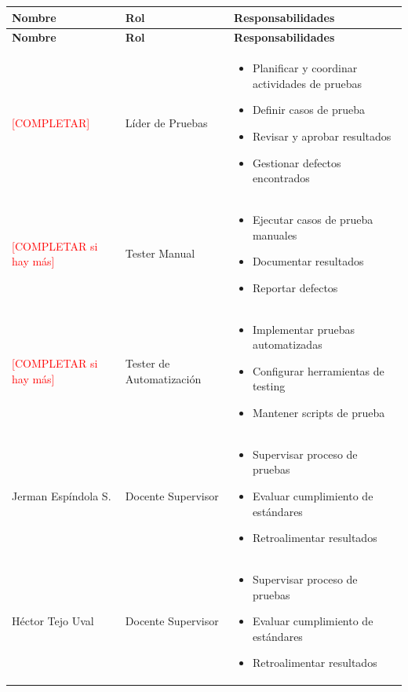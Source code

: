 \documentclass[12pt,a4paper]{article}
\begin{document}
\begin{longtable}{|p{4cm}|p{4cm}|p{6cm}|}
\hline
\textbf{Nombre} & \textbf{Rol} & \textbf{Responsabilidades} \\
\hline
\endfirsthead
\hline
\textbf{Nombre} & \textbf{Rol} & \textbf{Responsabilidades} \\
\hline
\endhead
\textcolor{red}{[COMPLETAR]} & Líder de Pruebas &
\begin{itemize}[leftmargin=*,nosep]
    \item Planificar y coordinar actividades de pruebas
    \item Definir casos de prueba
    \item Revisar y aprobar resultados
    \item Gestionar defectos encontrados
\end{itemize} \\
\hline
\textcolor{red}{[COMPLETAR si hay más]} & Tester Manual &
\begin{itemize}[leftmargin=*,nosep]
    \item Ejecutar casos de prueba manuales
    \item Documentar resultados
    \item Reportar defectos
\end{itemize} \\
\hline
\textcolor{red}{[COMPLETAR si hay más]} & Tester de Automatización &
\begin{itemize}[leftmargin=*,nosep]
    \item Implementar pruebas automatizadas
    \item Configurar herramientas de testing
    \item Mantener scripts de prueba
\end{itemize} \\
\hline
Jerman Espíndola S. & Docente Supervisor &
\begin{itemize}[leftmargin=*,nosep]
    \item Supervisar proceso de pruebas
    \item Evaluar cumplimiento de estándares
    \item Retroalimentar resultados
\end{itemize} \\
\hline
Héctor Tejo Uval & Docente Supervisor &
\begin{itemize}[leftmargin=*,nosep]
    \item Supervisar proceso de pruebas
    \item Evaluar cumplimiento de estándares
    \item Retroalimentar resultados
\end{itemize} \\
\hline
\end{longtable}
\end{document}

